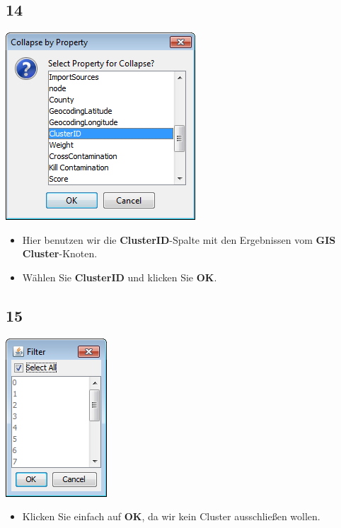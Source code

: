 \documentclass{beamer}
\begin{document}
\subsection{14}
\begin{frame}
	\begin{center}
  		\includegraphics[height=0.5\textheight]{14.png}
	\end{center}
	\begin{itemize}
		\item Hier benutzen wir die \textbf{ClusterID}-Spalte mit den Ergebnissen vom \textbf{GIS Cluster}-Knoten.
		\item Wählen Sie \textbf{ClusterID} und klicken Sie \textbf{OK}.
	\end{itemize}
\end{frame}

\subsection{15}
\begin{frame}
	\begin{center}
  		\includegraphics[height=0.5\textheight]{15.png}
	\end{center}
	\begin{itemize}
		\item Klicken Sie einfach auf \textbf{OK}, da wir kein Cluster ausschließen wollen.
	\end{itemize}
\end{frame}
\end{document}
